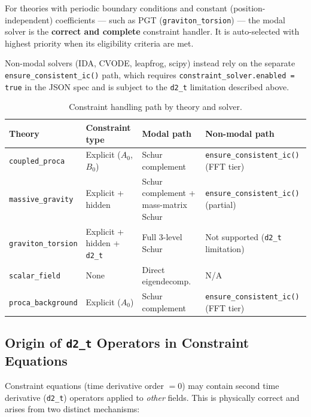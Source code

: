 For theories with periodic boundary conditions and constant (position-independent)
coefficients --- such as PGT (\texttt{graviton\_torsion}) --- the modal solver is
the \textbf{correct and complete} constraint handler. It is auto-selected with
highest priority when its eligibility criteria are met.

Non-modal solvers (IDA, CVODE, leapfrog, scipy) instead rely on the separate
\texttt{ensure\_consistent\_ic()} path, which requires
\texttt{constraint\_solver.enabled = true} in the JSON spec and is subject to the
\texttt{d2\_t} limitation described above.

\begin{table}[htbp]
\centering
\caption{Constraint handling path by theory and solver.}
\label{tab:cf-constraint-paths}
\begin{tabular}{@{}llll@{}}
\toprule
Theory & Constraint type & Modal path & Non-modal path \\
\midrule
\texttt{coupled\_proca} & Explicit ($A_0$, $B_0$) & Schur complement & \texttt{ensure\_consistent\_ic()} (FFT tier) \\
\texttt{massive\_gravity} & Explicit + hidden & Schur complement + mass-matrix Schur & \texttt{ensure\_consistent\_ic()} (partial) \\
\texttt{graviton\_torsion} & Explicit + hidden + \texttt{d2\_t} & Full 3-level Schur & Not supported (\texttt{d2\_t} limitation) \\
\texttt{scalar\_field} & None & Direct eigendecomp. & N/A \\
\texttt{proca\_background} & Explicit ($A_0$) & Schur complement & \texttt{ensure\_consistent\_ic()} (FFT tier) \\
\bottomrule
\end{tabular}
\end{table}

\subsection{Origin of \texttt{d2\_t} Operators in Constraint Equations}
\label{sec:cf-d2t-origin}

Constraint equations (time derivative order $= 0$) may contain second
time derivative (\texttt{d2\_t}) operators applied to \emph{other} fields.
This is physically correct and arises from two distinct mechanisms:

